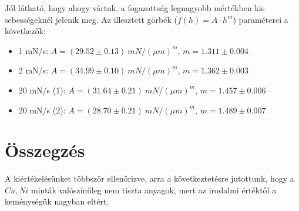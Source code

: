 \documentclass[a4paper,12pt]{article}
\begin{document}
\par Jól látható, hogy ahogy vártuk, a fogazottság legnagyobb mértékben kis sebességeknél jelenik meg. Az illesztett görbék ($f(h) = A\cdot h^{m}$) paraméterei a következők:

\begin{itemize}
\item 1 mN/s: $A = (29.52\pm0.13)~mN/(\mu m)^m$, $m = 1.311\pm0.004$
\item 2 mN/s: $A = (34.99\pm0.10)~mN/(\mu m)^m$, $m = 1.362\pm0.003$
\item 20 mN/s (1): $A = (31.64\pm0.21)~mN/(\mu m)^m$, $m = 1.457\pm0.006$
\item 20 mN/s (2): $A = (28.70\pm0.21)~mN/(\mu m)^m$, $m = 1.489\pm0.007$
\end{itemize}

\section{ Összegzés}

\par A kiértékelésünket többször ellenőrizve, arra a következtetésre jutottunk, hogy a $Cu, Ni$ minták valószínűleg nem tiszta anyagok, mert az irodalmi értéktől a keménységük nagyban eltért. 
\end{document}
